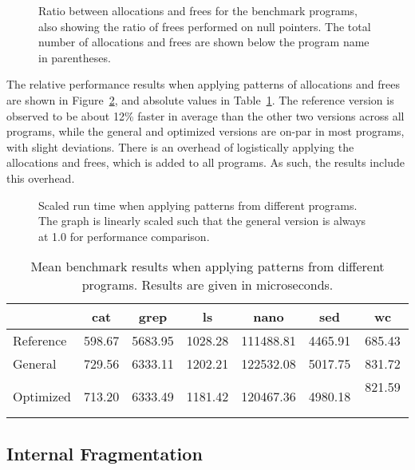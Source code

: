 \begin{figure}[H]
    \centering
    
    \caption{Ratio between allocations and frees for the benchmark programs, also showing the ratio of frees performed on null pointers. The total number of allocations and frees are shown below the program name in parentheses.}
    \label{fig:program_ratios}
\end{figure}

The relative performance results when applying patterns of allocations and frees are shown in Figure~\ref{fig:program_benchmarks}, and absolute values in Table~\ref{table:program_benchmarks}. The reference version is observed to be about 12\% faster in average than the other two versions across all programs, while the general and optimized versions are on-par in most programs, with slight deviations. There is an overhead of logistically applying the allocations and frees, which is added to all programs. As such, the results include this overhead. 

\begin{figure}[H]
    \centering
    
    \caption{Scaled run time when applying patterns from different programs. The graph is linearly scaled such that the general version is always at 1.0 for performance comparison.}
    \label{fig:program_benchmarks}
\end{figure}

\begin{table}[H]
    \centering
    \begin{tabular}{p{3.44cm}|cccccc}
    {} & {cat} & {grep} & {ls} & {nano} & {sed} & {wc} \\
    \hline
    Reference & 598.67 & 5683.95 & 1028.28 & 111488.81 & 4465.91 & 685.43 \\
    General & 729.56 & 6333.11 & 1202.21 & 122532.08 & 5017.75 & 831.72 \\
    Optimized & 713.20 & 6333.49 & 1181.42 & 120467.36 & 4980.18 & 821.59 \
    \end{tabular}
    \caption{Mean benchmark results when applying patterns from different programs. Results are given in microseconds.}
    \label{table:program_benchmarks}
\end{table}

\subsection{Internal Fragmentation}

